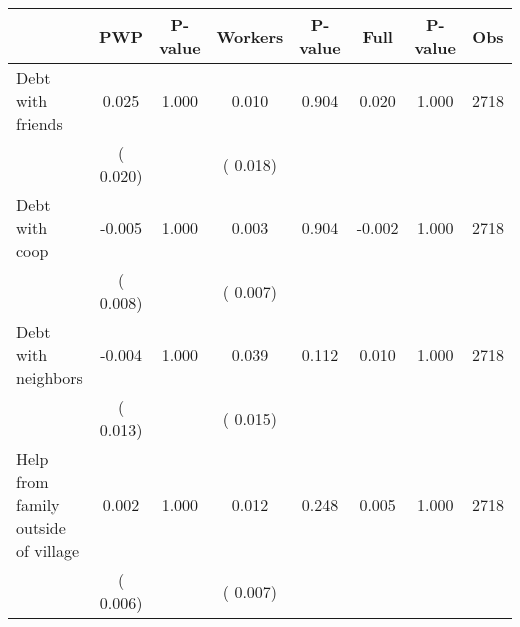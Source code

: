 
\begin{tabular}{l*{7}{c}}\hline&\multicolumn{1}{c}{PWP}&\multicolumn{1}{c}{P-value}&\multicolumn{1}{c}{Workers}&\multicolumn{1}{c}{P-value}&\multicolumn{1}{c}{Full}&\multicolumn{1}{c}{P-value}&\multicolumn{1}{c}{Obs} \\ \hline

 Debt with friends       &              0.025       &        1.000  &              0.010       &        0.904  &              0.020       &              1.000 &  2718 \\ 
                       &       (       0.020)             &                               &       (       0.018)                     &                               &                                               &                                &                      \\ 

 Debt with coop       &             -0.005       &        1.000  &              0.003       &        0.904  &             -0.002       &              1.000 &  2718 \\ 
                       &       (       0.008)             &                               &       (       0.007)                     &                               &                                               &                                &                      \\ 

 Debt with neighbors       &             -0.004       &        1.000  &              0.039       &        0.112  &              0.010       &              1.000 &  2718 \\ 
                       &       (       0.013)             &                               &       (       0.015)                     &                               &                                               &                                &                      \\ 

 Help from family outside of village       &              0.002       &        1.000  &              0.012       &        0.248  &              0.005       &              1.000 &  2718 \\ 
                       &       (       0.006)             &                               &       (       0.007)                     &                               &                                               &                                &                      \\ 


\end{tabular}
